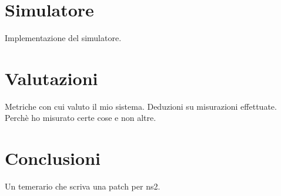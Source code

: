 \documentclass[12pt,a4paper,openright,twoside]{book}
\begin{document}
\chapter{Simulatore}
Implementazione del simulatore.

\chapter{Valutazioni}
Metriche con cui valuto il mio sistema. Deduzioni su misurazioni
effettuate. Perchè ho misurato certe cose e non altre.

\chapter*{Conclusioni}
Un temerario che scriva una patch per ns2.
\end{document}
